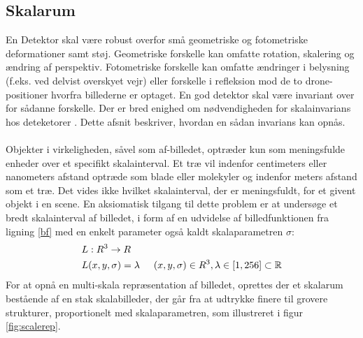 \subsection{Skalarum}
En Detektor skal være robust overfor små geometriske og fotometriske deformationer samt støj. Geometriske forskelle kan omfatte rotation, skalering og ændring af perspektiv.  Fotometriske forskelle kan omfatte ændringer i belysning (f.eks. ved delvist overskyet vejr) eller forskelle i refleksion mod de to drone-positioner hvorfra billederne er optaget. En god detektor skal være invariant over for sådanne forskelle. Der er bred enighed om nødvendigheden for skalainvarians hos deteketorer \cite{koen} \cite{blob} \cite{lindenscale}. Dette afsnit beskriver, hvordan en sådan invarians kan opnås. \\ \\
Objekter i virkeligheden, såvel som  af-billedet, optræder kun som meningsfulde enheder over et specifikt skalainterval. Et træ vil indenfor centimeters eller nanometers afstand optræde som blade eller molekyler og indenfor meters afstand som et træ. 
Det vides ikke hvilket skalainterval, der er meningsfuldt, for et givent objekt i en scene. 
En aksiomatisk tilgang til dette problem er at undersøge et bredt skalainterval af billedet, i form af en udvidelse af billedfunktionen fra ligning \eqref{bf} med en enkelt parameter også kaldt skalaparametren $\sigma$:
\begin{equation}
\begin{split}
&L: R^3 \rightarrow R \\
&L(x,y,\sigma) = \lambda \hspace{0.5 cm} (x,y,\sigma)\in R^3, \lambda \in [1,256] \subset \mathbb{R}
\end{split}
\end{equation}
For at opnå en multi-skala repræsentation af billedet, oprettes der et skalarum bestående af en stak skalabilleder, der går fra at udtrykke finere til grovere strukturer, proportionelt med skalaparametren, som illustreret i figur \ref{fig:scalerep}. 
